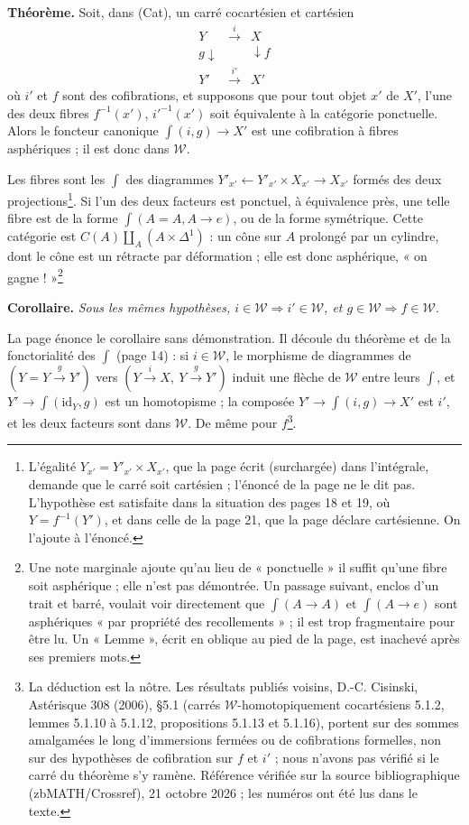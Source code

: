 \documentclass[11pt,a4paper]{article}
\begin{document}
\textbf{Théorème.} Soit, dans (Cat), un carré cocartésien et cartésien
\[
\begin{array}{ccc}
Y & \xrightarrow{\ i\ } & X \\
{\scriptstyle g}\downarrow & & \downarrow{\scriptstyle f} \\
Y' & \xrightarrow{\ i'\ } & X'
\end{array}
\]
où $i'$ et $f$ sont des cofibrations, et supposons que pour tout objet $x'$ de
$X'$, l'une des deux fibres $f^{-1}(x')$, $i'^{-1}(x')$ soit équivalente à la
catégorie ponctuelle. Alors le foncteur canonique $\int(i, g) \to X'$ est une
cofibration à fibres asphériques ; il est donc dans $\mathcal{W}$.

Les fibres sont les $\int$ des diagrammes $Y'_{x'} \leftarrow Y'_{x'} \times
X_{x'} \rightarrow X_{x'}$ formés des deux projections\footnote{L'égalité
$Y_{x'} = Y'_{x'} \times X_{x'}$, que la page écrit (surchargée) dans
l'intégrale, demande que le carré soit cartésien ; l'énoncé de la page ne le
dit pas. L'hypothèse est satisfaite dans la situation des pages 18 et 19, où
$Y = f^{-1}(Y')$, et dans celle de la page 21, que la page déclare cartésienne.
On l'ajoute à l'énoncé.}. Si l'un des deux facteurs est ponctuel, à
équivalence près, une telle fibre est de la forme $\int(A = A, A \to e)$, ou
de la forme symétrique. Cette catégorie est $C(A) \amalg_{A} (A \times
\Delta^{1})$ : un cône sur $A$ prolongé par un cylindre, dont le cône est un
rétracte par déformation ; elle est donc asphérique, « on gagne ! »\footnote{Une
note marginale ajoute qu'au lieu de « ponctuelle » il suffit
qu'une fibre soit asphérique ; elle n'est pas démontrée. Un passage
suivant, enclos d'un trait et barré, voulait voir directement que
$\int(A \to A)$ et $\int(A \to e)$ sont asphériques « par propriété des
recollements » ; il est trop fragmentaire pour être lu. Un « Lemme », écrit
en oblique au pied de la page, est inachevé après ses premiers mots.}

\textbf{Corollaire.} \emph{Sous les mêmes hypothèses, $i \in \mathcal{W}
\Rightarrow i' \in \mathcal{W}$, et $g \in \mathcal{W} \Rightarrow f \in
\mathcal{W}$.}

La page énonce le corollaire sans démonstration. Il découle du théorème et de
la fonctorialité des $\int$ (page 14) : si $i \in \mathcal{W}$, le morphisme
de diagrammes de $(Y = Y \xrightarrow{g} Y')$ vers $(Y \xrightarrow{i} X,\ Y \xrightarrow{g} Y')$
 induit une flèche de $\mathcal{W}$ entre leurs $\int$,
et $Y' \to \int(\mathrm{id}_{Y}, g)$ est un homotopisme ; la composée
$Y' \to \int(i, g) \to X'$ est $i'$, et les deux facteurs sont dans
$\mathcal{W}$. De même pour $f$\footnote{La déduction est la nôtre. Les
résultats publiés voisins, D.-C. Cisinski, Astérisque 308 (2006), §5.1
(carrés $\mathcal{W}$-homotopiquement cocartésiens 5.1.2, lemmes 5.1.10 à
5.1.12, propositions 5.1.13 et 5.1.16), portent sur des sommes amalgamées le
long d'immersions fermées ou de cofibrations formelles, non sur des
hypothèses de cofibration sur $f$ et $i'$ ; nous n'avons pas vérifié si le carré du théorème s'y ramène. Référence vérifiée sur la source bibliographique (zbMATH/Crossref), 21 octobre 2026 ; les numéros ont été lus dans le texte.}.
\end{document}
